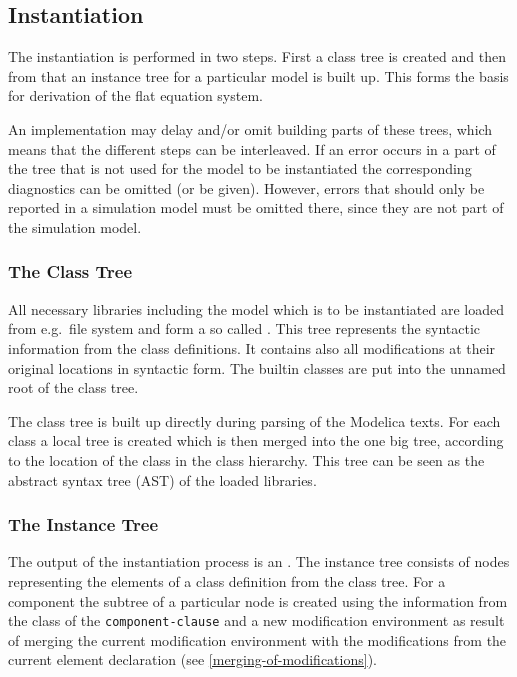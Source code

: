 \subsection{Instantiation}\label{instantiation}

The instantiation is performed in two steps.
First a class tree is created and then from that an instance tree for a particular model is built up.
This forms the basis for derivation of the flat equation system.

An implementation may delay and/or omit building parts of these trees, which means that the different steps can be interleaved.
If an error occurs in a part of the tree that is not used for the model to be instantiated the corresponding diagnostics can be omitted (or be given).
However, errors that should only be reported in a simulation model must be omitted there, since they are not part of the simulation model.


\subsubsection{The Class Tree}\label{the-class-tree}

All necessary libraries including the model which is to be instantiated are loaded from e.g.\ file system and form a so called .
This tree represents the syntactic information from the class definitions.
It contains also all modifications at their original locations in syntactic form.
The builtin classes are put into the unnamed root of the class tree.

\begin{nonnormative}
The class tree is built up directly during parsing of the Modelica texts.
For each class a local tree is created which is then merged into the one big tree, according to the location of the class in the class hierarchy.
This tree can be seen as the abstract syntax tree (AST) of the loaded libraries.
\end{nonnormative}


\subsubsection{The Instance Tree}\label{the-instance-tree}

The output of the instantiation process is an .
The instance tree consists of nodes representing the elements of a class definition from the class tree.
For a component the subtree of a particular node is created using the information from the class of the \lstinline[language=grammar]!component-clause! and a new modification environment as result of merging the current modification environment with the modifications from the current element declaration (see \cref{merging-of-modifications}).

